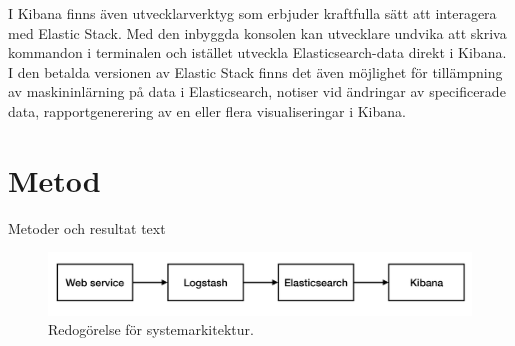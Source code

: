 \documentclass{kththesis}
\begin{document}
I Kibana finns även utvecklarverktyg som erbjuder kraftfulla sätt att interagera med Elastic Stack. Med den inbyggda konsolen kan utvecklare undvika att skriva kommandon i terminalen och istället utveckla Elasticsearch-data direkt i Kibana. I den betalda versionen av Elastic Stack finns det även möjlighet för tillämpning av maskininlärning på data i Elasticsearch, notiser vid ändringar av specificerade data, rapportgenerering av en eller flera visualiseringar i Kibana.


\chapter{Metod}
Metoder och resultat text
\blindtext


\begin{figure}[h]
\centering
\includegraphics[width=1\textwidth]{Systemarkitektur}
\caption{Redogörelse för systemarkitektur.}
\end{figure}
\captionsetup[table]{name=Tabel}
\end{document}
